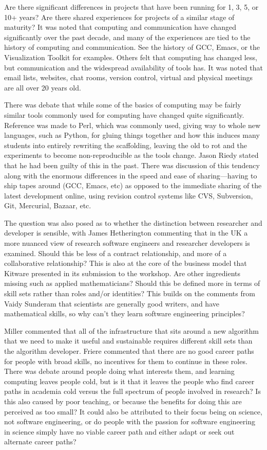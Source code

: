 \documentclass[11pt, oneside]{amsart}
\begin{document}
Are there significant differences in projects that have been running for 1, 3,
5, or 10+ years? Are there shared experiences for projects of a similar stage
of maturity? It was noted that computing and communication have changed
significantly over the past decade, and many of the experiences are tied to
the history of computing and communication. See the history of GCC, Emacs, or
the Visualization Toolkit for examples. Others felt that computing has changed
less, but communication and the widespread availability of tools has. It was
noted that email lists, websites, chat rooms, version control, virtual and
physical meetings are all over 20 years old.

There was debate that while some of the basics of computing may be fairly
similar tools commonly used for computing have changed quite
significantly. Reference was made to Perl, which was commonly used, giving way
to whole new languages, such as Python, for gluing things together and how this
induces many students into entirely rewriting the scaffolding, leaving the old
to rot and the experiments to become non-reproducible as the tools change.
Jason Riedy stated that he had been guilty of this in the past. There was
discussion of this tendency along with the enormous differences in the speed and
ease of sharing---having to ship tapes around (GCC, Emacs, etc) as opposed to
the immediate sharing of the latest development online, using revision control
systems like CVS, Subversion, Git, Mercurial, Bazaar, etc.

The question was also posed as to whether the distinction between researcher
and developer is sensible, with James Hetherington commenting that in the UK
a more nuanced view of research software engineers
and researcher developers is examined. Should this be less of a contract relationship, and
more of a collaborative relationship? This is also at the core of the business
model that Kitware presented in its submission to the workshop. Are other
ingredients missing such as applied mathematicians? Should this be defined more
in terms of skill sets rather than roles and/or identities? This builds on the
comments from Vaidy Sunderam that scientists are generally good writers, and
have mathematical skills, so why can't they learn software engineering
principles?

Miller commented that all of the infrastructure that sits around a new
algorithm that we need to make it useful and sustainable requires different
skill sets than the algorithm developer. Friere commented that there are no
good career paths for people with broad skills, no incentives for them to
continue in these roles. There was debate around people doing what interests
them, and learning computing leaves people cold, but is it that it leaves the
people who find career paths in academia cold versus the full spectrum of
people involved in research? Is this also caused by poor teaching, or because the
benefits for doing this are perceived as too small? It could also be attributed to
their focus being on science, not software engineering, or do people with
the passion for software engineering in science simply have no viable career
path and either adapt or seek out alternate career paths?
\end{document}
